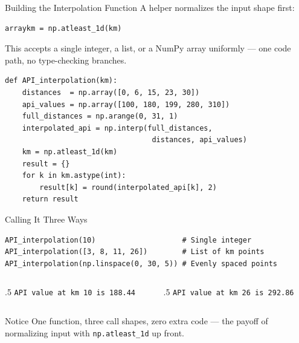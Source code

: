 \documentclass[9pt,aspectratio=169,xcolor=table]{beamer}
\begin{document}
\begin{frame}[fragile]{Building the Interpolation Function}
    \leavevmode
    A helper normalizes the input shape first:

\begin{lstlisting}
arraykm = np.atleast_1d(km)
\end{lstlisting}
    \small
    This accepts a single integer, a list, or a NumPy array uniformly
    --- one code path, no type-checking branches.

\begin{lstlisting}
def API_interpolation(km):
    distances  = np.array([0, 6, 15, 23, 30])
    api_values = np.array([100, 180, 199, 280, 310])
    full_distances = np.arange(0, 31, 1)
    interpolated_api = np.interp(full_distances,
                                  distances, api_values)
    km = np.atleast_1d(km)
    result = {}
    for k in km.astype(int):
        result[k] = round(interpolated_api[k], 2)
    return result
\end{lstlisting}
\end{frame}

\begin{frame}[fragile]{Calling It Three Ways}
    \leavevmode
\begin{lstlisting}
API_interpolation(10)                    # Single integer
API_interpolation([3, 8, 11, 26])        # List of km points
API_interpolation(np.linspace(0, 30, 5)) # Evenly spaced points
\end{lstlisting}

    \vspace{2mm}
    \begin{columns}[t]
        \begin{column}{.5\textwidth}
            \small\texttt{API value at km 10 is 188.44}
        \end{column}
        \begin{column}{.5\textwidth}
            \small\texttt{API value at km 26 is 292.86}
        \end{column}
    \end{columns}

    \vspace{2mm}
    \begin{block}{Notice}
        One function, three call shapes, zero extra code --- the payoff
        of normalizing input with \texttt{np.atleast\_1d} up front.
    \end{block}
\end{frame}
\end{document}

